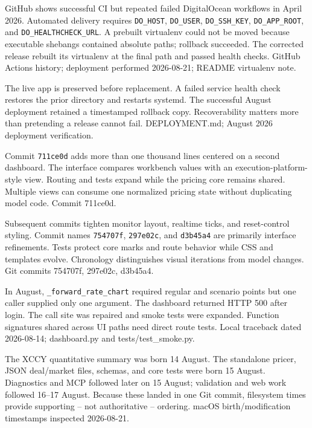 {GitHub shows successful CI but repeated failed DigitalOcean workflows in April 2026.}
{Automated delivery requires \texttt{DO\_HOST}, \texttt{DO\_USER}, \texttt{DO\_SSH\_KEY}, \texttt{DO\_APP\_ROOT}, and \texttt{DO\_HEALTHCHECK\_URL}.}
{A prebuilt virtualenv could not be moved because executable shebangs contained absolute paths; rollback succeeded.}
{The corrected release rebuilt its virtualenv at the final path and passed health checks.}
{GitHub Actions history; deployment performed 2026-08-21; README virtualenv note.}

{The live app is preserved before replacement.}
{A failed service health check restores the prior directory and restarts systemd.}
{The successful August deployment retained a timestamped rollback copy.}
{Recoverability matters more than pretending a release cannot fail.}
{DEPLOYMENT.md; August 2026 deployment verification.}

{Commit \texttt{711ce0d} adds more than one thousand lines centered on a second dashboard.}
{The interface compares workbench values with an execution-platform-style view.}
{Routing and tests expand while the pricing core remains shared.}
{Multiple views can consume one normalized pricing state without duplicating model code.}
{Commit 711ce0d.}

{Subsequent commits tighten monitor layout, realtime ticks, and reset-control styling.}
{Commit names \texttt{754707f}, \texttt{297e02c}, and \texttt{d3b45a4} are primarily interface refinements.}
{Tests protect core marks and route behavior while CSS and templates evolve.}
{Chronology distinguishes visual iterations from model changes.}
{Git commits 754707f, 297e02c, d3b45a4.}

{In August, \texttt{\_forward\_rate\_chart} required regular and scenario points but one caller supplied only one argument.}
{The dashboard returned HTTP 500 after login.}
{The call site was repaired and smoke tests were expanded.}
{Function signatures shared across UI paths need direct route tests.}
{Local traceback dated 2026-08-14; dashboard.py and tests/test\_smoke.py.}

{The XCCY quantitative summary was born 14 August.}
{The standalone pricer, JSON deal/market files, schemas, and core tests were born 15 August.}
{Diagnostics and MCP followed later on 15 August; validation and web work followed 16--17 August.}
{Because these landed in one Git commit, filesystem times provide supporting -- not authoritative -- ordering.}
{macOS birth/modification timestamps inspected 2026-08-21.}


